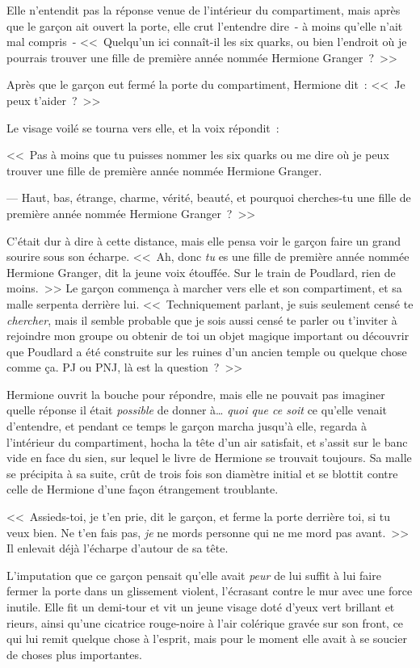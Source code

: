 Elle n'entendit pas la réponse venue de l'intérieur du compartiment, mais après que le garçon ait ouvert la porte, elle crut l'entendre dire~- à moins qu'elle n'ait mal compris~- <<~Quelqu'un ici connaît-il les six quarks, ou bien l'endroit où je pourrais trouver une fille de première année nommée Hermione Granger~?~>>

Après que le garçon eut fermé la porte du compartiment, Hermione dit~: <<~Je peux t'aider~?~>>

Le visage voilé se tourna vers elle, et la voix répondit~:

<<~Pas à moins que tu puisses nommer les six quarks ou me dire où je peux trouver une fille de première année nommée Hermione Granger.

--- Haut, bas, étrange, charme, vérité, beauté, et pourquoi cherches-tu une fille de première année nommée Hermione Granger~?~>>

C'était dur à dire à cette distance, mais elle pensa voir le garçon faire un grand sourire sous son écharpe. <<~Ah, donc \emph{tu} es une fille de première année nommée Hermione Granger, dit la jeune voix étouffée. Sur le train de Poudlard, rien de moins.~>> Le garçon commença à marcher vers elle et son compartiment, et sa malle serpenta derrière lui. <<~Techniquement parlant, je suis seulement censé te \emph{chercher}, mais il semble probable que je sois aussi censé te parler ou t'inviter à rejoindre mon groupe ou obtenir de toi un objet magique important ou découvrir que Poudlard a été construite sur les ruines d'un ancien temple ou quelque chose comme ça. PJ ou PNJ, là est la question~?~>>

Hermione ouvrit la bouche pour répondre, mais elle ne pouvait pas imaginer quelle réponse il était \emph{possible} de donner à… \emph{quoi que ce soit} ce qu'elle venait d'entendre, et pendant ce temps le garçon marcha jusqu'à elle, regarda à l'intérieur du compartiment, hocha la tête d'un air satisfait, et s'assit sur le banc vide en face du sien, sur lequel le livre de Hermione se trouvait toujours. Sa malle se précipita à sa suite, crût de trois fois son diamètre initial et se blottit contre celle de Hermione d'une façon étrangement troublante.

<<~Assieds-toi, je t'en prie, dit le garçon, et ferme la porte derrière toi, si tu veux bien. Ne t'en fais pas, \emph{je} ne mords personne qui ne me mord pas avant.~>> Il enlevait déjà l'écharpe d'autour de sa tête.

L'imputation que ce garçon pensait qu'elle avait \emph{peur} de lui suffit à lui faire fermer la porte dans un glissement violent, l'écrasant contre le mur avec une force inutile. Elle fit un demi-tour et vit un jeune visage doté d'yeux vert brillant et rieurs, ainsi qu'une cicatrice rouge-noire à l'air colérique gravée sur son front, ce qui lui remit quelque chose à l'esprit, mais pour le moment elle avait à se soucier de choses plus importantes.

